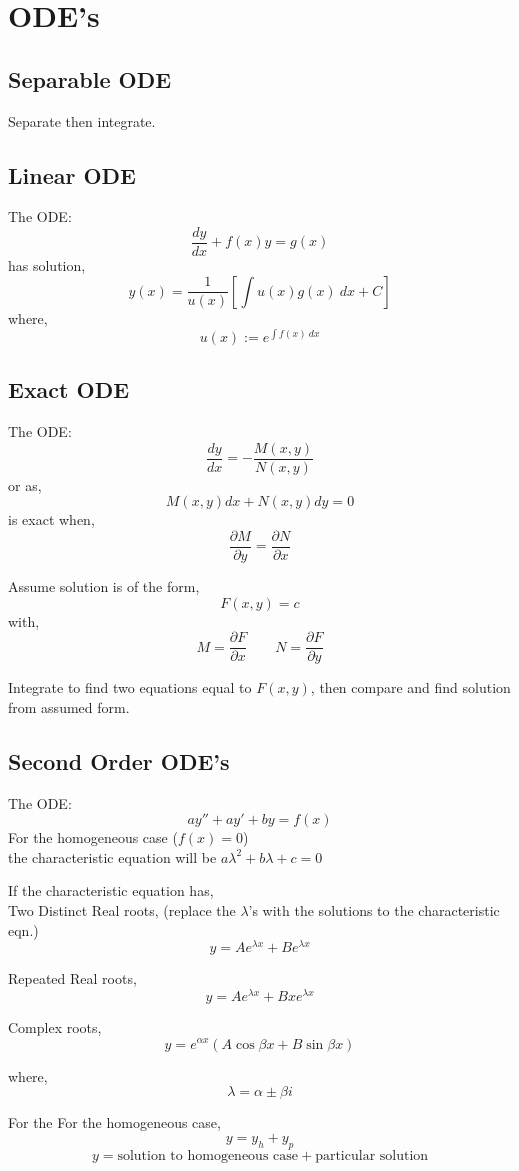 \documentclass[a4paper,10pt]{article}
\begin{document}
\section*{ODE's}
\subsection*{Separable ODE}
Separate then integrate.

\subsection*{Linear ODE}
The ODE:
$$ \frac{dy}{dx} + f(x)y=g(x) $$
has solution,
$$ y(x) = \frac{1}{u(x)}\left [ \int u(x)g(x)\ dx + C \right] $$
 where,
$$ u(x) := e^{\int f(x)\ dx} $$

\subsection*{Exact ODE}
The ODE:
$$ \frac{dy}{dx} = -\frac{M(x,y)}{N(x,y)} $$
or as,
$$ M(x,y)dx + N(x,y)dy = 0 $$
 is exact when,
$$ \frac{\partial M}{\partial y} = \frac{\partial N}{\partial x} $$

Assume solution is of the form,
$$ F(x,y) = c $$
with,
$$ M = \frac{\partial F}{\partial x} \qquad N = \frac{\partial F}{\partial y}$$

Integrate to find two equations equal to $F(x,y)$, then compare and find solution from assumed form.

\subsection*{Second Order ODE's}
The ODE:
$$ay'' + ay' + by = f(x)$$
For the homogeneous case ($f(x) = 0$)\\
the characteristic equation will be $a\lambda^2 + b\lambda + c = 0$

If the characteristic equation has,\\
Two Distinct Real roots, (replace the $\lambda$'s with the solutions to the characteristic eqn.)
$$ y = Ae^{\lambda x} + Be^{\lambda x}$$

Repeated Real roots,
$$ y = Ae^{\lambda x} + Bxe^{\lambda x}$$

Complex roots,
$$ y = e^{\alpha x}(A\cos \beta x + B\sin \beta x)$$

where,
$$\lambda = \alpha \pm \beta i$$

For the For the homogeneous case,
$$y = y_h + y_p$$
$$y = \mbox{solution to homogeneous case} + \mbox{particular solution}$$
\end{document}
